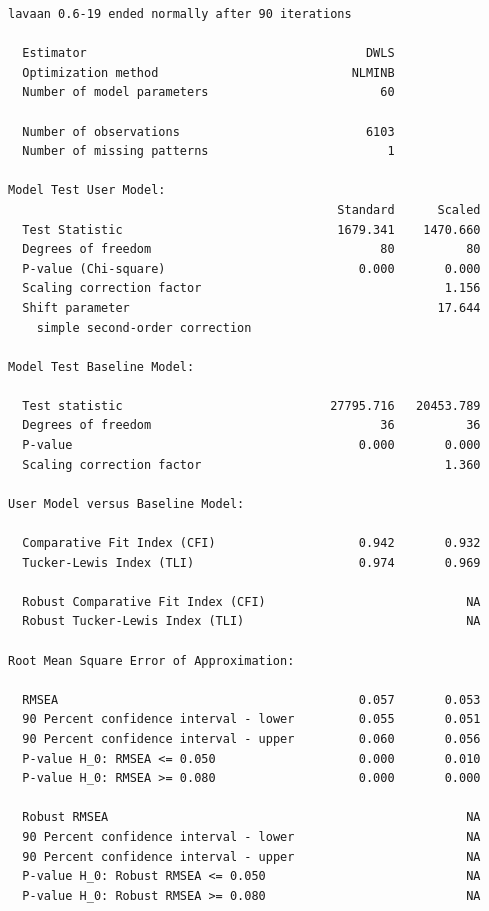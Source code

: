 \documentclass[
  12pt,
  a4paper,
  DIV=11,
  numbers=noendperiod]{scrartcl}
\begin{document}
\begin{verbatim}
lavaan 0.6-19 ended normally after 90 iterations

  Estimator                                       DWLS
  Optimization method                           NLMINB
  Number of model parameters                        60

  Number of observations                          6103
  Number of missing patterns                         1

Model Test User Model:
                                              Standard      Scaled
  Test Statistic                              1679.341    1470.660
  Degrees of freedom                                80          80
  P-value (Chi-square)                           0.000       0.000
  Scaling correction factor                                  1.156
  Shift parameter                                           17.644
    simple second-order correction                                

Model Test Baseline Model:

  Test statistic                             27795.716   20453.789
  Degrees of freedom                                36          36
  P-value                                        0.000       0.000
  Scaling correction factor                                  1.360

User Model versus Baseline Model:

  Comparative Fit Index (CFI)                    0.942       0.932
  Tucker-Lewis Index (TLI)                       0.974       0.969
                                                                  
  Robust Comparative Fit Index (CFI)                            NA
  Robust Tucker-Lewis Index (TLI)                               NA

Root Mean Square Error of Approximation:

  RMSEA                                          0.057       0.053
  90 Percent confidence interval - lower         0.055       0.051
  90 Percent confidence interval - upper         0.060       0.056
  P-value H_0: RMSEA <= 0.050                    0.000       0.010
  P-value H_0: RMSEA >= 0.080                    0.000       0.000
                                                                  
  Robust RMSEA                                                  NA
  90 Percent confidence interval - lower                        NA
  90 Percent confidence interval - upper                        NA
  P-value H_0: Robust RMSEA <= 0.050                            NA
  P-value H_0: Robust RMSEA >= 0.080                            NA


\end{verbatim}
\end{document}
